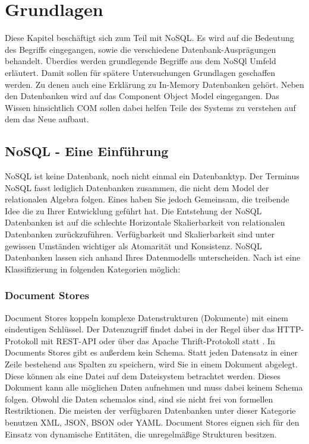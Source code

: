
\chapter{Grundlagen}
\label{ch:grundlagen}

Diese Kapitel beschäftigt sich zum Teil mit NoSQL. Es wird auf die Bedeutung des Begriffs eingegangen, sowie die verschiedene Datenbank-Ausprägungen behandelt. Überdies werden grundlegende Begriffe aus dem NoSQl Umfeld erläutert. Damit sollen für spätere Untersuchungen Grundlagen geschaffen werden. Zu denen auch eine Erklärung zu In-Memory Datenbanken gehört. Neben den Datenbanken wird auf das Component Object Model eingegangen. Das Wissen hinsichtlich COM sollen dabei helfen Teile des Systems zu verstehen auf dem das Neue aufbaut.

\section{NoSQL - Eine Einführung}
\label{ch:grundlagen:sec:NoSQL}

NoSQL ist keine Datenbank, noch nicht einmal ein Datenbanktyp. Der Terminus NoSQL fasst lediglich Datenbanken zusammen, die nicht dem Model der relationalen Algebra folgen. Eines haben Sie jedoch Gemeinsam, die treibende Idee die zu Ihrer Entwicklung geführt hat. Die Entstehung der NoSQL Datenbanken ist auf die schlechte Horizontale Skalierbarkeit von relationalen Datenbanken zurückzuführen. Verfügbarkeit und Skalierbarkeit sind unter gewissen Umständen wichtiger als Atomarität und Konsistenz. NoSQL Datenbanken lassen sich anhand Ihres Datenmodells unterscheiden. Nach \cite{vaish2013getting} ist eine Klassifizierung in folgenden Kategorien möglich:

\subsection{Document Stores}
\label{ch:grundlagen:sec:NoSQL:DocumentStores}

Document Stores koppeln komplexe Datenstrukturen (Dokumente) mit einem eindeutigen Schlüssel. Der Datenzugriff findet dabei in der Regel über das HTTP-Protokoll mit REST-API oder über das Apache Thrift-Protokoll statt \cite{agarwal2007thrift}. In Documents Stores gibt es außerdem kein Schema. Statt jeden Datensatz in einer Zeile bestehend aus Spalten zu speichern, wird Sie in einem Dokument abgelegt. Diese können als eine Datei auf dem Dateisystem betrachtet werden. Dieses Dokument kann alle möglichen Daten aufnehmen und muss dabei keinem Schema folgen. Obwohl die Daten schemalos sind, sind sie nicht frei von formellen Restriktionen. Die meisten der verfügbaren Datenbanken unter dieser Kategorie benutzen XML, JSON, BSON oder YAML. Document Stores eignen sich für den Einsatz von dynamische Entitäten, die unregelmäßige Strukturen besitzen.

